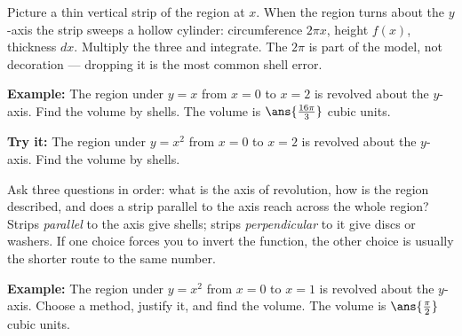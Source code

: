 \documentclass[12pt]{article}
\begin{document}
\begin{formulabox}
Picture a thin vertical strip of the region at $x$. When the region turns about
the $y$-axis the strip sweeps a hollow cylinder: circumference $2\pi x$, height
$f(x)$, thickness $dx$. Multiply the three and integrate. The $2\pi$ is part of
the model, not decoration --- dropping it is the most common shell error.
\end{formulabox}

\begin{examplebox}
\textbf{Example:} The region under $y = x$ from $x = 0$ to $x = 2$ is revolved
about the $y$-axis. Find the volume by shells.
The volume is $\ans{\tfrac{16\pi}{3}}$ cubic units.
\end{examplebox}

\begin{tryitbox}
\textbf{Try it:} The region under $y = x^2$ from $x = 0$ to $x = 2$ is revolved
about the $y$-axis. Find the volume by shells.\\[2pt]
\end{tryitbox}


\begin{formulabox}
Ask three questions in order: what is the axis of revolution, how is the region
described, and does a strip parallel to the axis reach across the whole region?
Strips \emph{parallel} to the axis give shells; strips \emph{perpendicular} to
it give discs or washers. If one choice forces you to invert the function, the
other choice is usually the shorter route to the same number.
\end{formulabox}

\begin{examplebox}
\textbf{Example:} The region under $y = x^2$ from $x = 0$ to $x = 1$ is
revolved about the $y$-axis. Choose a method, justify it, and find the volume.
The volume is $\ans{\tfrac{\pi}{2}}$ cubic units.
\end{examplebox}
\end{document}
